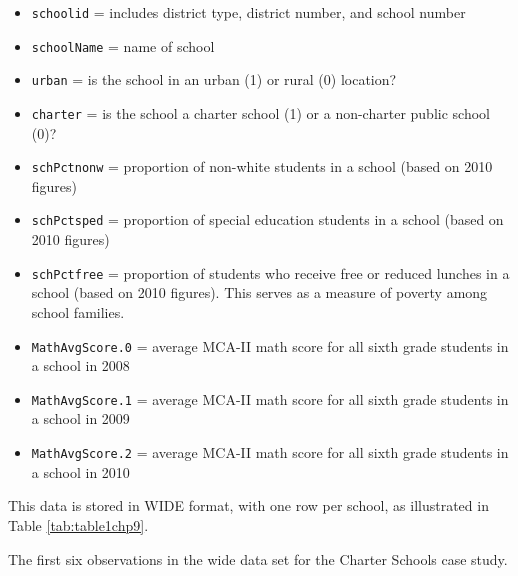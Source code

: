 \documentclass[
]{krantz}
\providecommand{\tightlist}{%
  \setlength{\itemsep}{0pt}\setlength{\parskip}{0pt}}
\begin{document}
\begin{itemize}
\tightlist
\item
  \texttt{schoolid} = includes district type, district number, and school number
\item
  \texttt{schoolName} = name of school
\item
  \texttt{urban} = is the school in an urban (1) or rural (0) location?
\item
  \texttt{charter} = is the school a charter school (1) or a non-charter public school (0)?
\item
  \texttt{schPctnonw} = proportion of non-white students in a school (based on 2010 figures)
\item
  \texttt{schPctsped} = proportion of special education students in a school (based on 2010 figures)
\item
  \texttt{schPctfree} = proportion of students who receive free or reduced lunches in a school (based on 2010 figures). This serves as a measure of poverty among school families.
\item
  \texttt{MathAvgScore.0} = average MCA-II math score for all sixth grade students in a school in 2008
\item
  \texttt{MathAvgScore.1} = average MCA-II math score for all sixth grade students in a school in 2009
\item
  \texttt{MathAvgScore.2} = average MCA-II math score for all sixth grade students in a school in 2010
\end{itemize}

This data is stored in WIDE format, with one row per school, as illustrated in Table \ref{tab:table1chp9}.

\label{tab:table1chp9} The first six observations in the wide data set for the Charter Schools case study.
\end{document}
